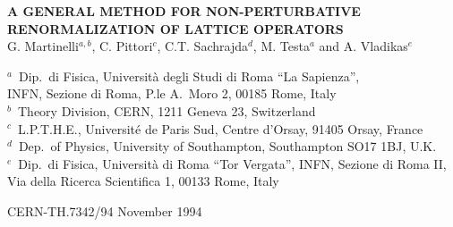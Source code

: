 \documentclass[11pt]{article}
\begin{document}
\begin{center}
{\LARGE\bfseries A GENERAL METHOD FOR NON-PERTURBATIVE\\[4pt] RENORMALIZATION OF LATTICE OPERATORS\footnotemark}\\[1.8em]
{\large G. Martinelli$^{a,b}$, C. Pittori$^{c}$,
C.T. Sachrajda$^{d}$, M. Testa$^{a}$ and A. Vladikas$^{e}$}\\[1.2em]
{\small
$^{a}$~Dip.\ di Fisica, Universit\`a degli Studi di Roma ``La Sapienza'',\\
INFN, Sezione di Roma, P.le A.\ Moro 2, 00185 Rome, Italy\\[3pt]
$^{b}$~Theory Division, CERN, 1211 Geneva 23, Switzerland\\[3pt]
$^{c}$~L.P.T.H.E., Universit\'e de Paris Sud, Centre d'Orsay, 91405 Orsay, France\\[3pt]
$^{d}$~Dep.\ of Physics, University of Southampton, Southampton SO17 1BJ, U.K.\\[3pt]
$^{e}$~Dip.\ di Fisica, Universit\`a di Roma ``Tor Vergata'', INFN, Sezione di Roma II,\\
Via della Ricerca Scientifica 1, 00133 Rome, Italy\par}
\end{center}
\begingroup\let\thefootnote\relax{}\endgroup

\begin{abstract}
We propose a non-perturbative method for computing the renormalization
constants of  generic
composite operators. This method is intended to reduce some systematic errors,
which are present when one tries to obtain physical predictions
 from the matrix
elements of lattice operators. We also present the results of a calculation
of the renormalization constants of several two-fermion operators, obtained,
with our method, by
numerical simulation of $QCD$, on a $16^3 \times 32$ lattice, at $\beta=6.0$.
The results of this simulation are encouraging, and further applications
to four-fermion operators and to the heavy quark effective theory are
proposed.
\end{abstract}

\vspace{1em}
\noindent CERN-TH.7342/94 \quad November 1994









\end{document}
